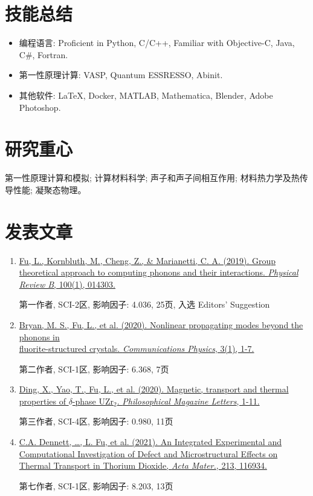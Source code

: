\documentclass[
  a4paper,
  12pt
]{cv}
\begin{document}
\section{技能总结}
\begin{itemize}
\item
编程语言:   
Proficient in
Python, C/C++, 
Familiar with Objective-C, Java, C\#, Fortran.
\item
第一性原理计算: 
VASP, Quantum ESSRESSO, Abinit.
\item
其他软件:    
{\LaTeX}, 
Docker,
MATLAB, 
Mathematica, 
Blender,
Adobe Photoshop.
\end{itemize}


\section{研究重心}
第一性原理计算和模拟;
计算材料科学;
声子和声子间相互作用;
材料热力学及热传导性能; 
凝聚态物理。


\section{发表文章}

\begin{enumerate}
\item
\href{https://doi.org/10.1103/PhysRevB.100.014303}
{\underline{Fu, L.}, Kornbluth, M., Cheng, Z., \& Marianetti, C. A. (2019). 
Group theoretical approach to computing phonons and their interactions. 
\textit{Physical Review B}, 100(1), 014303.}

第一作者, SCI-2区, 影响因子: 4.036, 25页, 入选 Editors' Suggestion
%
\item
\href{https://doi.org/10.1038/s42005-020-00483-2}{
Bryan, M. S., \underline{Fu, L.}, et al. (2020). 
Nonlinear propagating modes beyond the phonons in \\fluorite-structured crystals.
\textit{Communications Physics}, 3(1), 1-7.}

第二作者, SCI-1区, 影响因子: 6.368, 7页
%
\item
\href{https://doi.org/10.1080/09500839.2020.1833375}{
Ding, X., Yao, T., \underline{Fu, L.}, et al. (2020).
Magnetic, transport and thermal properties of $\delta$-phase UZr$_{2}$.
\textit{Philosophical Magazine Letters}, 1-11.}

第三作者, SCI-4区, 影响因子: 0.980, 11页
%
\item
\href{https://doi.org/10.1016/j.actamat.2021.116934}{
C.A. Dennett, \dots, \underline{L. Fu}, et al. (2021).
An Integrated Experimental and Computational Investigation of Defect and Microstructural Effects on Thermal Transport in Thorium Dioxide, %
\textit{Acta Mater.}, 213, 116934.
}

第七作者, SCI-1区, 影响因子: 8.203, 13页
%
\end{enumerate}
\end{document}
